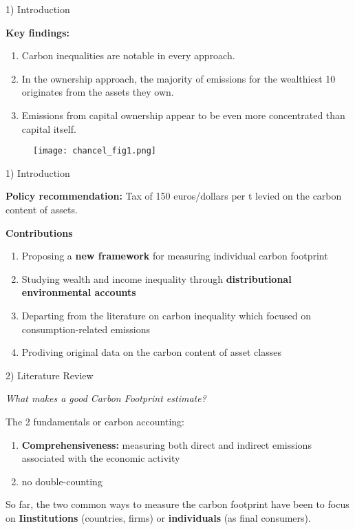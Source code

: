 \documentclass[10pt]{beamer}
\begin{document}
\begin{frame}{1) Introduction}

 \small \textbf{Key findings:}
  {\footnotesize
    \begin{enumerate}
        \item Carbon inequalities are notable in every approach.
        \item In the ownership approach, the majority of emissions for the wealthiest 10 \percent originates from the assets they own.
        \item Emissions from capital ownership appear to be even more concentrated than capital itself.
    \end{enumerate}
  }
  
  \begin{figure}[h]
    \centering
    \texttt{[image: chancel\_fig1.png]}
    \label{fig:schnabel}
   \end{figure}

\end{frame}



\begin{frame}{1) Introduction}

\textbf{Policy recommendation:} Tax of 150 euros/dollars per t levied on the carbon content of assets.

 \textbf{Contributions}
    \begin{enumerate}
        \item Proposing a \textbf{new framework} for measuring individual carbon footprint
        \item Studying wealth and income inequality through \textbf{distributional environmental accounts}
        \item Departing from the literature on carbon inequality which focused on consumption-related emissions
        \item Prodiving original data on the carbon content of asset classes
    \end{enumerate}
    
\end{frame}



\begin{frame}{2) Literature Review}

\textit{What makes a good Carbon Footprint estimate?}

{\small
The 2 fundamentals or carbon accounting:
    \begin{enumerate}
        \item \textbf{Comprehensiveness:} measuring both direct and indirect emissions associated with the economic activity
        \item {} no double-counting

    \end{enumerate}
}

So far, the two common ways to measure the carbon footprint have been to focus on \textbf{Iinstitutions} (countries, firms) or \textbf{individuals} (as final consumers).

\end{frame}
\end{document}
